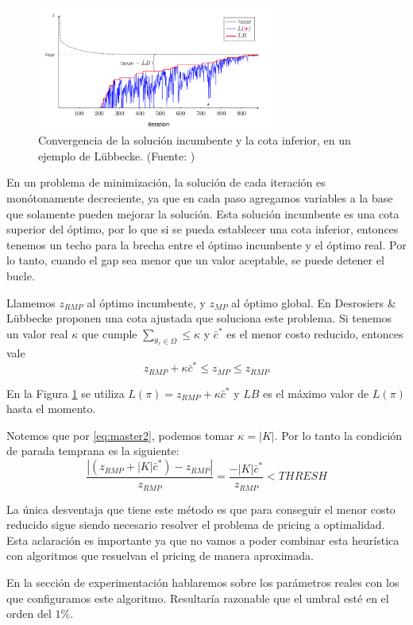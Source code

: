 \begin{figure}[H]
\centering
\includegraphics[width=0.7\textwidth]{img/Screenshot from 2023-10-11 00-03-23.png}
\caption{Convergencia de la solución incumbente y la cota inferior, en un ejemplo de Lübbecke. (Fuente: \cite{co-at-work-luebbecke})}
\label{fig:bound-convergence}
\centering
\end{figure}

En un problema de minimización, la solución de cada iteración es monótonamente decreciente, ya que en cada paso agregamos variables a la base que solamente pueden mejorar la solución. Esta solución incumbente es una cota superior del óptimo, por lo que si se pueda establecer una cota inferior, entonces tenemos un techo para la brecha entre el óptimo incumbente y el óptimo real. Por lo tanto, cuando el gap sea menor que un valor aceptable, se puede detener el bucle.

Llamemos $z_{RMP}$ al óptimo incumbente, y $z_{MP}$ al óptimo global. En \cite{desrosiers2005primer} Desrosiers \& Lübbecke proponen una cota ajustada que soluciona este problema. Si tenemos un valor real $\kappa$ que cumple $\sum_{\theta_r \in \Omega} \leq \kappa$ y $\bar{c}^{*}$ es el menor costo reducido, entonces vale
\begin{equation}
    z_{RMP} + \kappa \bar{c}^{*} \leq z_{MP} \leq z_{RMP}
\end{equation}

En la Figura \ref{fig:bound-convergence} se utiliza $L(\pi) = z_{RMP} + \kappa \bar{c}^{*}$ y $LB$ es el máximo valor de $L(\pi)$ hasta el momento.

Notemos que por \ref{eq:master2}, podemos tomar $\kappa = |K|$. Por lo tanto la condición de parada temprana es la siguiente:
\begin{equation}
     \frac{|(z_{RMP} + |K| \bar{c}^{*}) - z_{RMP}|}{z_{RMP}} = \frac{-|K| \bar{c}^{*}}{z_{RMP}}  < THRESH
\end{equation}

La única desventaja que tiene este método es que para conseguir el menor costo reducido sigue siendo necesario resolver el problema de pricing a optimalidad. Esta aclaración es importante ya que no vamos a poder combinar esta heurística con algoritmos que resuelvan el pricing de manera aproximada.

En la sección de experimentación hablaremos sobre los parámetros reales con los que configuramos este algoritmo. Resultaría razonable que el umbral esté en el orden del $1\%$.
